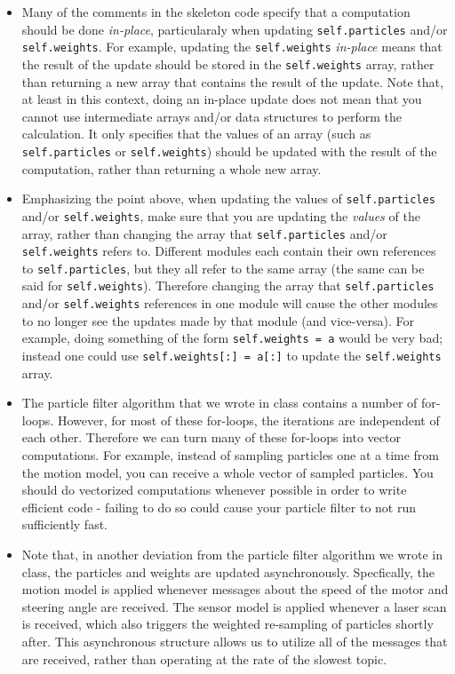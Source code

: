 \documentclass[final]{article}
\begin{document}
\begin{itemize}

\item Many of the comments in the skeleton code specify that a computation should be done \textit{in-place}, particularaly when updating \texttt{self.particles} and/or \texttt{self.weights}. For example, updating the \texttt{self.weights} \textit{in-place} means that the result of the update should be stored in the \texttt{self.weights} array, rather than returning a new array that contains the result of the update. Note that, at least in this context, doing an in-place update does not mean that you cannot use intermediate arrays and/or data structures to perform the calculation. It only specifies that the values of an array (such as \texttt{self.particles} or \texttt{self.weights}) should be updated with the result of the computation, rather than returning a whole new array.

\item Emphasizing the point above, when updating the values of \texttt{self.particles} and/or \texttt{self.weights}, make sure that you are updating the \textit{values} of the array, rather than changing the array that \texttt{self.particles} and/or \texttt{self.weights} refers to. Different modules each contain their own references to \texttt{self.particles}, but they all refer to the same array (the same can be said for \texttt{self.weights}). Therefore changing the array that \texttt{self.particles} and/or \texttt{self.weights} references in one module will cause the other modules to no longer see the updates made by that module (and vice-versa). For example, doing something of the form \texttt{self.weights = a} would be very bad; instead one could use \texttt{self.weights[:] = a[:]} to update the \texttt{self.weights} array.

\item The particle filter algorithm that we wrote in class contains a number of for-loops. However, for most of these for-loops, the iterations are independent of each other. Therefore we can turn many of these for-loops into vector computations. For example, instead of sampling particles one at a time from the motion model, you can receive a whole vector of sampled particles. You should do vectorized computations whenever possible in order to write efficient code - failing to do so could cause your particle filter to not run sufficiently fast.

\item Note that, in another deviation from the particle filter algorithm we wrote in class, the particles and weights are updated asynchronously. Specfically, the motion model is applied whenever messages about the speed of the motor and steering angle are received. The sensor model is applied whenever a laser scan is received, which also triggers the weighted re-sampling of particles shortly after. This asynchronous structure allows us to utilize all of the messages that are received, rather than operating at the rate of the slowest topic.


\end{itemize}
\end{document}
